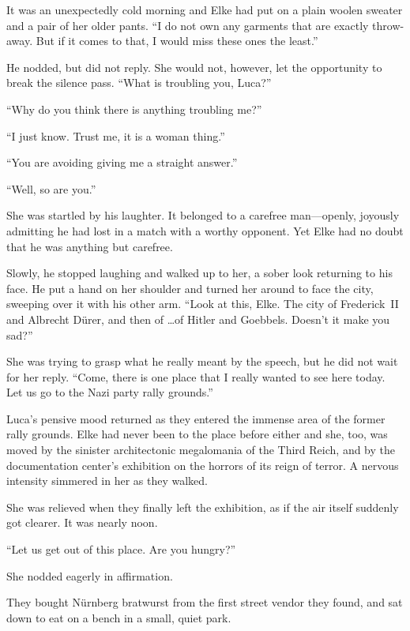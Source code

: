 It was an unexpectedly cold morning and Elke had put on a plain woolen sweater and a pair of her older pants. ``I do not own any garments that are exactly throw-away. But if it comes to that, I would miss these ones the least.''

He nodded, but did not reply. She would not, however, let the opportunity to break the silence pass. ``What is troubling you, Luca?''

``Why do you think there is anything troubling me?''

``I just know. Trust me, it is a woman thing.''

``You are avoiding giving me a straight answer.''

``Well, so are you.''

She was startled by his laughter. It belonged to a carefree man---openly, joyously admitting he had lost in a match with a worthy opponent. Yet Elke had no doubt that he was anything but carefree.

Slowly, he stopped laughing and walked up to her, a sober look returning to his face. He put a hand on her shoulder and turned her around to face the city, sweeping over it with his other arm. ``Look at this, Elke. The city of \mbox{Frederick II} and Albrecht Dürer, and then of \ldots of Hitler and Goebbels. Doesn't it make you sad?''

She was trying to grasp what he really meant by the speech, but he did not wait for her reply. ``Come, there is one place that I really wanted to see here today. Let us go to the Nazi party rally grounds.''

\sectionline

Luca's pensive mood returned as they entered the immense area of the former rally grounds. Elke had never been to the place before either and she, too, was moved by the sinister architectonic megalomania of the Third Reich, and by the documentation center's exhibition on the horrors of its reign of terror. A nervous intensity simmered in her as they walked.

She was relieved when they finally left the exhibition, as if the air itself suddenly got clearer. It was nearly noon.

``Let us get out of this place. Are you hungry?''

She nodded eagerly in affirmation.

\sectionline

They bought Nürnberg bratwurst from the first street vendor they found, and sat down to eat on a bench in a small, quiet park.


